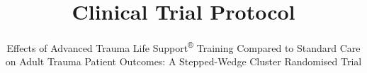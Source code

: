 \documentclass[
]{scrartcl}
\title{Clinical Trial Protocol}
\subtitle{Effects of Advanced Trauma Life Support\textsuperscript{®}
Training Compared to Standard Care on Adult Trauma Patient Outcomes: A
Stepped-Wedge Cluster Randomised Trial}
\author{}
\date{}
\begin{document}


\begin{titlepage}


\newcommand{\titlepagepagealign}{
\ifthenelse{\equal{center}{right}}{\raggedleft}{}
\ifthenelse{\equal{center}{center}}{\centering}{}
\ifthenelse{\equal{center}{left}}{\raggedright}{}
}


\newcommand{\titleandsubtitle}{
{\fontsize{36}{44}\selectfont
\textcolor{white}{\mdseries{\nohyphens{Clinical Trial Protocol}}}\par
}%

\vspace{\betweentitlesubtitle}
{
\fontsize{28}{30}\selectfont
\textcolor{white}{\sffamily{\nohyphens{Effects of Advanced Trauma Life
Support\textsuperscript{®} Training Compared to Standard Care on Adult
Trauma Patient Outcomes: A Stepped-Wedge Cluster Randomised Trial}}}\par
}}
\newcommand{\titlepagetitleblock}{
\titleandsubtitle
}

\newcommand{\authorstyle}[1]{{\textbf{#1}}}

\newcommand{\affiliationstyle}[1]{{\large{#1}}}

\newcommand{\titlepageauthorblock}{
{\authorstyle{\\}}
}

\newcommand{\titlepageaffiliationblock}{
\hangindent=1em
\hangafter=1
{\affiliationstyle{


\vspace{1\baselineskip} 
}}
}
\newcommand{\headerstyled}{%
{}
}
\newcommand{\footerstyled}{%
{\LARGE{Version 1.6.0, 2026-11-09}}
}
\newcommand{\datestyled}{%
{}
}


\newcommand{\titlepageheaderblock}{\headerstyled}

\newcommand{\titlepagefooterblock}{
\footerstyled
}

\newcommand{\titlepagedateblock}{
\datestyled
}

\newcommand{\titleblock}{\newlength{\betweentitlesubtitle}
\setlength{\betweentitlesubtitle}{0.5cm}
{
\titlepagetitlefont
{\titlepagetitleblock}
}

\vspace{1.5cm}
}

\newcommand{\authorblock}{}

\newcommand{\affiliationblock}{}


\end{titlepage}
\end{document}
